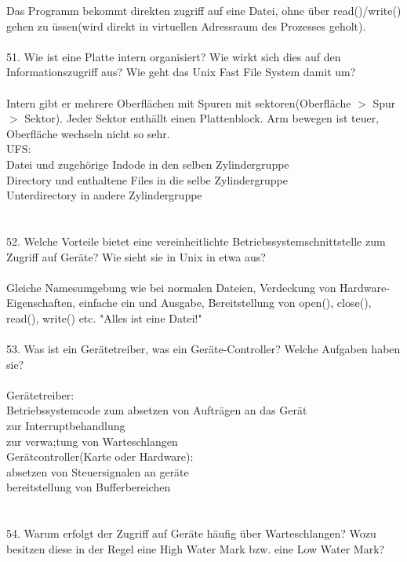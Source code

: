 \documentclass{article}
\newcommand\tab[1][1cm]{\hspace*{#1}}
\begin{document}
Das Programm bekommt direkten zugriff auf eine Datei, ohne \"uber read()/write() gehen zu \"ussen(wird direkt in virtuellen Adressraum des Prozesses geholt).
\\
\\
51. Wie ist eine Platte intern organisiert? Wie wirkt sich dies auf den Informationszugriff aus?
Wie geht das Unix Fast File System damit um?
\\
\\
Intern gibt er mehrere Oberfl\"achen mit Spuren mit sektoren(Oberf\"l\"ache $>$ Spur $>$ Sektor). Jeder Sektor enth\"allt einen Plattenblock. Arm bewegen ist teuer, Oberfl\"ache wechseln nicht so sehr.\\
UFS:\\
\tab Datei und zugeh\"orige Indode in den selben Zylindergruppe\\
\tab Directory und enthaltene Files in die selbe Zylindergruppe\\
\tab Unterdirectory in andere Zylindergruppe\\
\\
\\
52. Welche Vorteile bietet eine vereinheitlichte Betriebssystemschnittstelle zum Zugriff auf Geräte? Wie sieht sie in Unix in etwa aus?
\\
\\
Gleiche Namesumgebung wie bei normalen Dateien, Verdeckung von Hardware-Eigenschaften, einfache ein und Ausgabe, Bereitstellung von open(), close(), read(), write() etc.
"Alles ist eine Datei!"
\\
\\
53. Was ist ein Gerätetreiber, was ein Geräte-Controller? Welche Aufgaben haben sie?
\\
\\
Ger\"atetreiber:\\
\tab Betriebssystemcode zum absetzen von Auftr\"agen an das Ger\"at\\
\tab zur Interruptbehandlung\\
\tab zur verwa;tung von Warteschlangen\\
Ger\"atcontroller(Karte oder Hardware):\\
\tab absetzen von Steuersignalen an ger\"ate\\
\tab bereitstellung von Bufferbereichen\\
\\
\\
54. Warum erfolgt der Zugriff auf Geräte häufig über Warteschlangen? Wozu besitzen diese in der Regel eine High Water Mark bzw. eine Low Water Mark?
\end{document}
